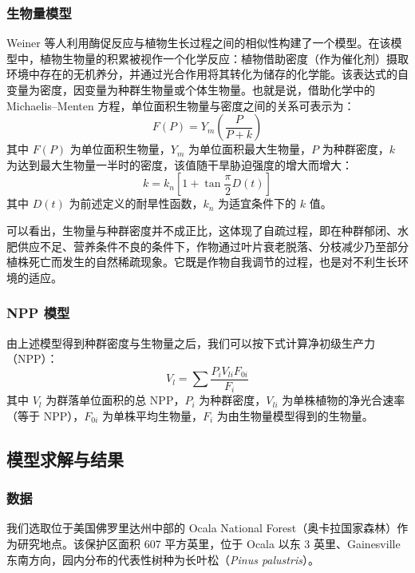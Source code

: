 \documentclass[11pt,a4paper]{ctexart}
\begin{document}
\subsubsection{生物量模型}

Weiner 等人利用酶促反应与植物生长过程之间的相似性构建了一个模型\cite{ref10}。在该模型中，植物生物量的积累被视作一个化学反应：植物借助密度（作为催化剂）摄取环境中存在的无机养分，并通过光合作用将其转化为储存的化学能。该表达式的自变量为密度，因变量为种群生物量或个体生物量\cite{ref8}。也就是说，借助化学中的 Michaelis--Menten 方程，单位面积生物量与密度之间的关系可表示为：
\begin{equation}
F(P)=Y_m\left(\frac{P}{P+k}\right)
\end{equation}
其中 $F(P)$ 为单位面积生物量，$Y_m$ 为单位面积最大生物量，$P$ 为种群密度，$k$ 为达到最大生物量一半时的密度，该值随干旱胁迫强度的增大而增大：
\begin{equation}
k=k_n\left[1+\tan\frac{\pi}{2}D(t)\right]
\end{equation}
其中 $D(t)$ 为前述定义的耐旱性函数，$k_n$ 为适宜条件下的 $k$ 值。

可以看出，生物量与种群密度并不成正比，这体现了自疏过程，即在种群郁闭、水肥供应不足、营养条件不良的条件下，作物通过叶片衰老脱落、分枝减少乃至部分植株死亡而发生的自然稀疏现象。它既是作物自我调节的过程，也是对不利生长环境的适应。

\subsubsection{NPP 模型}

由上述模型得到种群密度与生物量之后，我们可以按下式计算净初级生产力（NPP）：
\begin{equation}
V_l=\sum\frac{P_iV_{li}F_{0i}}{F_i}
\end{equation}
其中 $V_l$ 为群落单位面积的总 NPP，$P_i$ 为种群密度，$V_{li}$ 为单株植物的净光合速率（等于 NPP），$F_{0i}$ 为单株平均生物量，$F_i$ 为由生物量模型得到的生物量。

\subsection{模型求解与结果}

\subsubsection{数据}

我们选取位于美国佛罗里达州中部的 Ocala National Forest（奥卡拉国家森林）作为研究地点。该保护区面积 607 平方英里，位于 Ocala 以东 3 英里、Gainesville 东南方向，园内分布的代表性树种为长叶松（\textit{Pinus palustris}）。
\end{document}
